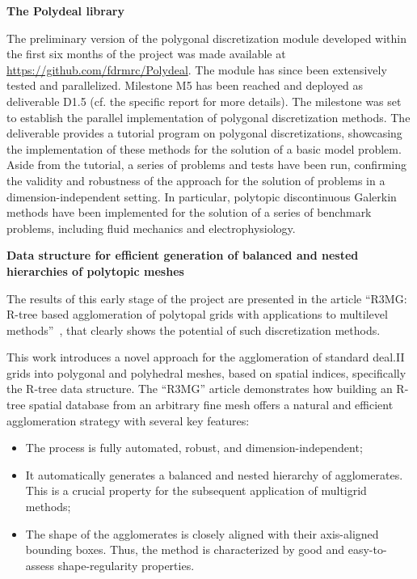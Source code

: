 \documentclass[a4paper,12pt, numbers]{article}
\begin{document}
\noindent\textbf{The Polydeal library}

The preliminary version of the polygonal discretization module developed within the first six months of the project was made available at \url{https://github.com/fdrmrc/Polydeal}.
The module has since been extensively tested and parallelized. 
Milestone M5 has been reached and deployed as deliverable D1.5 (cf. the specific report for more details). The milestone was set to establish the parallel implementation of polygonal discretization methods. The deliverable provides a tutorial program on polygonal discretizations, showcasing the implementation of these methods for the solution of a basic model problem. Aside from the tutorial, a series of problems and tests have been run, confirming the validity and robustness of the approach for the solution of problems in a dimension-independent setting. In particular, polytopic discontinuous Galerkin methods have been implemented for the solution of a series of benchmark problems, including fluid mechanics and electrophysiology.

\noindent\textbf{Data structure for efficient generation of balanced and nested hierarchies of  polytopic meshes}

The results of this early stage of the project are presented in the article ``R3MG:
R-tree based agglomeration of polytopal grids with applications to multilevel
methods''~\cite{FederEtAl2025}, that clearly shows the potential of such
discretization methods. 

This work introduces a novel approach for the agglomeration of standard deal.II
grids into polygonal and polyhedral meshes, based on spatial indices,
specifically the R-tree data structure. The ``R3MG'' article demonstrates how
building an R-tree spatial database from an arbitrary fine mesh offers a natural
and efficient agglomeration strategy with several key features: 

\begin{itemize}
\item The process is fully automated, robust, and dimension-independent;
\item It automatically generates a balanced and nested hierarchy of agglomerates. This is a crucial property for
the subsequent application of multigrid methods;
\item The shape of the agglomerates is closely aligned with their axis-aligned bounding boxes. Thus, the method is characterized by good and easy-to-assess shape-regularity properties.
\end{itemize}
\end{document}
